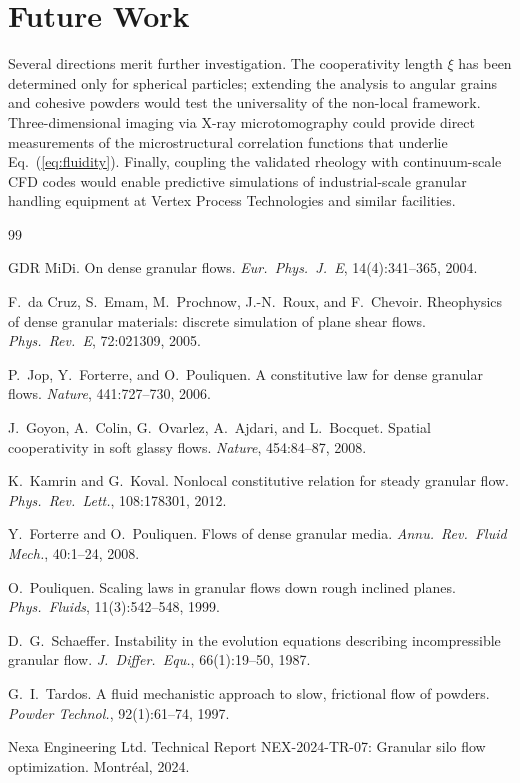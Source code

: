 \section*{Future Work}

Several directions merit further investigation. The cooperativity length $\xi$ has been determined only for spherical particles; extending the analysis to angular grains and cohesive powders would test the universality of the non-local framework. Three-dimensional imaging via X-ray microtomography could provide direct measurements of the microstructural correlation functions that underlie Eq.~(\ref{eq:fluidity}). Finally, coupling the validated rheology with continuum-scale CFD codes would enable predictive simulations of industrial-scale granular handling equipment at Vertex Process Technologies and similar facilities.

\vspace{20pt}

\begin{thebibliography}{99}

GDR MiDi.
\newblock On dense granular flows.
\newblock \textit{Eur.\ Phys.\ J.\ E}, 14(4):341--365, 2004.

F.\ da Cruz, S.\ Emam, M.\ Prochnow, J.-N.\ Roux, and F.\ Chevoir.
\newblock Rheophysics of dense granular materials: discrete simulation of plane shear flows.
\newblock \textit{Phys.\ Rev.\ E}, 72:021309, 2005.

P.\ Jop, Y.\ Forterre, and O.\ Pouliquen.
\newblock A constitutive law for dense granular flows.
\newblock \textit{Nature}, 441:727--730, 2006.

J.\ Goyon, A.\ Colin, G.\ Ovarlez, A.\ Ajdari, and L.\ Bocquet.
\newblock Spatial cooperativity in soft glassy flows.
\newblock \textit{Nature}, 454:84--87, 2008.

K.\ Kamrin and G.\ Koval.
\newblock Nonlocal constitutive relation for steady granular flow.
\newblock \textit{Phys.\ Rev.\ Lett.}, 108:178301, 2012.

Y.\ Forterre and O.\ Pouliquen.
\newblock Flows of dense granular media.
\newblock \textit{Annu.\ Rev.\ Fluid Mech.}, 40:1--24, 2008.

O.\ Pouliquen.
\newblock Scaling laws in granular flows down rough inclined planes.
\newblock \textit{Phys.\ Fluids}, 11(3):542--548, 1999.

D.\ G.\ Schaeffer.
\newblock Instability in the evolution equations describing incompressible granular flow.
\newblock \textit{J.\ Differ.\ Equ.}, 66(1):19--50, 1987.

G.\ I.\ Tardos.
\newblock A fluid mechanistic approach to slow, frictional flow of powders.
\newblock \textit{Powder Technol.}, 92(1):61--74, 1997.

Nexa Engineering Ltd.
\newblock Technical Report NEX-2024-TR-07: Granular silo flow optimization.
\newblock Montr\'eal, 2024.

\end{thebibliography}

